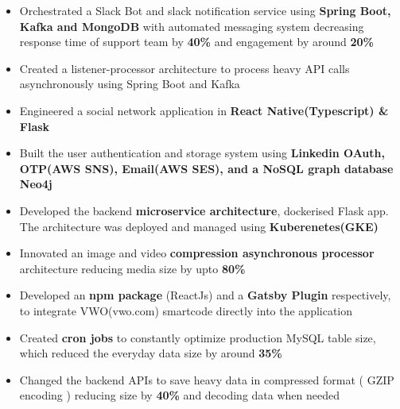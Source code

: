 \documentclass[10pt,a4paper,ragged2e,withhyper]{altacv}
\begin{document}
\begin{paracol}{2}
\divider\smallskip

\begin{itemize}
\item Orchestrated a Slack Bot and slack notification service using {\bf Spring Boot, Kafka and MongoDB} with automated messaging system decreasing response time of support team by {\bf 40\%} and engagement by around {\bf 20\%}
\item Created a listener-processor architecture to process heavy API calls asynchronously using Spring Boot and Kafka
\end{itemize}

\divider\smallskip


\begin{itemize}
\item Engineered a social network application in {\bf React Native(Typescript) \& Flask}
\item Built the user authentication and storage system using {\bf Linkedin OAuth, OTP(AWS SNS), Email(AWS SES), and a NoSQL graph database Neo4j}
\item Developed the backend {\bf microservice architecture}, dockerised Flask app. The architecture was deployed and managed using {\bf Kuberenetes(GKE)}
\item Innovated an image and video {\bf compression asynchronous processor} architecture reducing media size by upto {\bf 80\% }
\end{itemize}

\divider\smallskip

\begin{itemize}
\item Developed an {\bf npm package} (ReactJs) and a {\bf Gatsby Plugin} respectively, to integrate VWO(vwo.com) smartcode directly into the application
\item Created {\bf cron jobs} to constantly optimize production MySQL table size, which reduced the everyday data size by around {\bf 35\%}
\item Changed the backend APIs to save heavy data in compressed format ( GZIP encoding ) reducing size by {\bf40\%} and decoding data when needed
\end{itemize}


\end{paracol}
\end{document}
